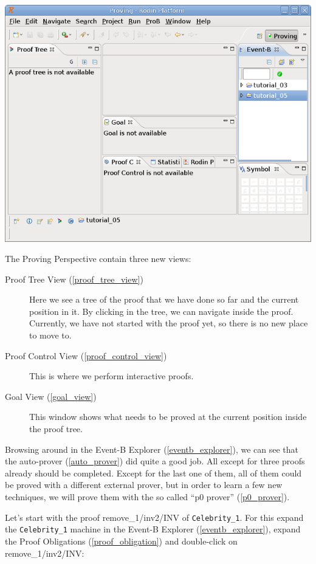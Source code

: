 \begin{center}
	\includegraphics{img/tutorial/tut_08_proving_perspective.png}
\end{center}

The Proving Perspective contain three new views:

\begin{description}
	\item[Proof Tree View (\ref{proof_tree_view})] Here we see a tree of the proof that we have done so far and the current position in it. By clicking in the tree, we can navigate inside the proof. Currently, we have not started with the proof yet, so there is no new place to move to. 
	\item[Proof Control View (\ref{proof_control_view})] This is where we perform interactive proofs.
	\item[Goal View (\ref{goal_view})] This window shows what needs to be proved at the current position inside the proof tree.
\end{description}

Browsing around in the Event-B Explorer (\ref{eventb_explorer}), we can see that the auto-prover (\ref{auto_prover}) did quite a good job. All except for three proofs already should be completed. Except for the last one of them, all of them could be proved with a different external prover, but in order to learn a few new techniques, we will prove them with the so called ``p0 prover'' (\ref{p0_prover}).

Let's start with the proof \textsf{remove\_1/inv2/INV} of \texttt{Celebrity\_1}. For this expand the \texttt{Celebrity\_1} machine in the Event-B Explorer (\ref{eventb_explorer}), expand the Proof Obligations (\ref{proof_obligation}) and double-click on \textsf{remove\_1/inv2/INV}:

